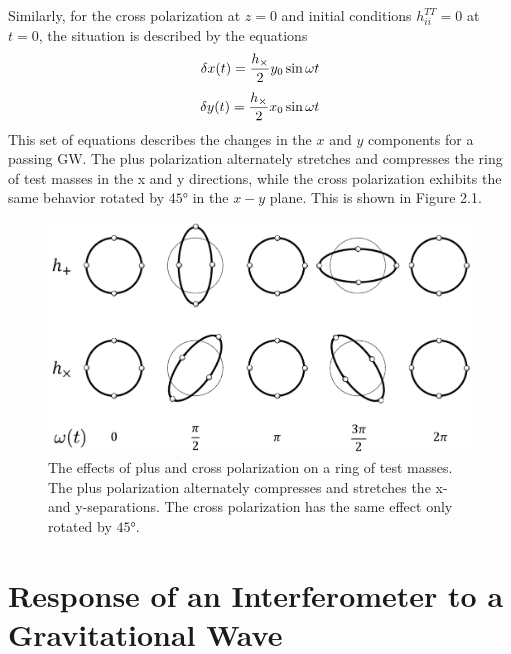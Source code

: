 \documentclass[binding=0.6cm, LaM]{sapthesis}
\begin{document}
        Similarly, for the cross polarization at $z=0$ and initial conditions $h_{ii}^{TT} = 0$ at $t= 0$, the situation is described by the equations
                \begin{equation}
                	\delta x(t) =  {{h_{\times}} \over 2} y_0 \sin \omega t
                \end{equation}
                \begin{equation}
                	\delta y(t) =  {{h_{\times}} \over 2} x_0  \sin \omega t
                \end{equation}
        This set of equations describes the changes in the $x$ and $y$ components for a passing GW.
        The plus polarization alternately stretches and compresses the ring of test masses in the x and y directions,
        while the cross polarization exhibits the same behavior rotated by $\ang{45}$ in the $x - y$ plane. This is shown in Figure 2.1.
                \begin{figure}[H]
                \label{ring}
                \includegraphics[scale=1]{ring}
                \centering
                \caption{The effects of plus and cross polarization on a ring of test masses. The plus polarization alternately compresses and stretches the x- and y-separations. The cross polarization has the same effect only rotated by  $\ang{45}$.}
                \label{fig:ring}
                \end{figure}

\section{Response of an Interferometer to a Gravitational Wave}
\end{document}
